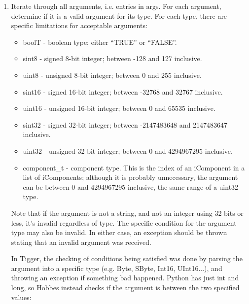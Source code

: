\documentclass[12pt,letterpaper]{article}
\begin{document}
\begin{enumerate}

\item Iterate through all arguments, i.e. entries in args. For each argument, determine if it is a valid argument for its type. For each type, there are specific limitations for acceptable arguments:

\begin{itemize}

\item boolT - boolean type; either ``TRUE'' or ``FALSE''.

\item sint8 - signed 8-bit integer; between -128 and 127 inclusive.

\item uint8 - unsigned 8-bit integer; between 0 and 255 inclusive.

\item sint16 - signed 16-bit integer; between -32768 and 32767 inclusive.

\item uint16 - unsigned 16-bit integer; between 0 and 65535 inclusive.

\item sint32 - signed 32-bit integer; between -2147483648 and 2147483647 inclusive.

\item uint32 - unsigned 32-bit integer; between 0 and 4294967295 inclusive.

\item component\_t - component type. This is the index of an iComponent in a list of iComponents; although it is probably unnecessary, the argument can be between 0 and 4294967295 inclusive, the same range of a uint32 type.

\end{itemize}

Note that if the argument is not a string, and not an integer using 32 bits or less, it's invalid regardless of type. The specific condition for the argument type may also be invalid. In either case, an exception should be thrown stating that an invalid argument was received.

In Tigger, the checking of conditions being satisfied was done by parsing the argument into a specific type (e.g. Byte, SByte, Int16, UInt16...), and throwing an exception if something bad happened. Python has just int and long, so Hobbes instead checks if the argument is between the two specified values:


\end{enumerate}
\end{document}
